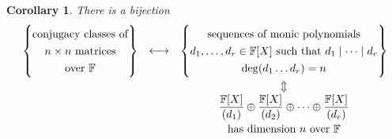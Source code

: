 \documentclass{article}
\theoremstyle{plain}\theoremheaderfont{\normalfont\itshape}\theorembodyfont{\rmfamily}\theoremseparator{.}\newtheorem*{rem}{Remark}\newtheorem*{ex}{Example}\newtheorem*{proof}{Proof}\newtheorem*{altp}{Alternative proof}\newtheorem*{nonex}{Non-Example}
\theoremstyle{plain}\theoremheaderfont{\normalfont\bfseries}\theorembodyfont{\rmfamily}\theoremseparator{.}\newtheorem{thm}{Theorem}[section]\newtheorem{lem}[thm]{Lemma}\newtheorem{prop}[thm]{Proposition}\newtheorem*{cor}{Corollary}\newtheorem{defn}[thm]{Definition}\newtheorem{clm}[thm]{Claim}\newtheorem{clminproof}{Claim}\newtheorem*{notn}{Notation}\newtheorem*{exer}{Exercise}\newtheorem*{lemnn}{Lemma}
\theoremstyle{break}\theoremheaderfont{\normalfont\itshape}\theorembodyfont{\rmfamily}\theoremseparator{.\medskip}\newtheorem*{proofskip}{Proof}\newtheorem*{exs}{Examples}\newtheorem*{rems}{Remarks}\newtheorem*{obs}{Observations}
\theoremstyle{break}\theoremheaderfont{\normalfont\bfseries}\theorembodyfont{\rmfamily}\theoremseparator{.\medskip}\newtheorem{lemskip}[thm]{Lemma}\newtheorem{defnskip}[thm]{Definition}\newtheorem{propskip}[thm]{Proposition}\newtheorem{thmskip}[thm]{Theorem}
\numberwithin{equation}{section}
\newcommand{\FF}{\mathbb{F}}
\begin{document}
    \begin{cor}
        There is a bijection
        \[\def\arraystretch{1.3}
        \begin{array}{ccc}
            \left\{\begin{matrix}
                \text{conjugacy classes of}\\
                \text{\(n\times n\) matrices}\\
                \text{over \(\FF\)}
            \end{matrix}\right\}&\longleftrightarrow&\left\{\begin{matrix}
                \text{sequences of monic polynomials}\\
                d_1,\dots,d_r\in\FF[X]\text{ such that }d_1\mid\dots\mid d_r\\
                \deg(d_1\dots d_r)=n
            \end{matrix}\right\}\\
            &&\displaystyle\Updownarrow\\
            &&\displaystyle\frac{\FF[X]}{(d_1)}\oplus\frac{\FF[X]}{(d_2)}\oplus\dots\oplus\frac{\FF[X]}{(d_r)}\\
            &&\text{has dimension \(n\) over \(\FF\)}
        \end{array}\]
    \end{cor}
\end{document}
